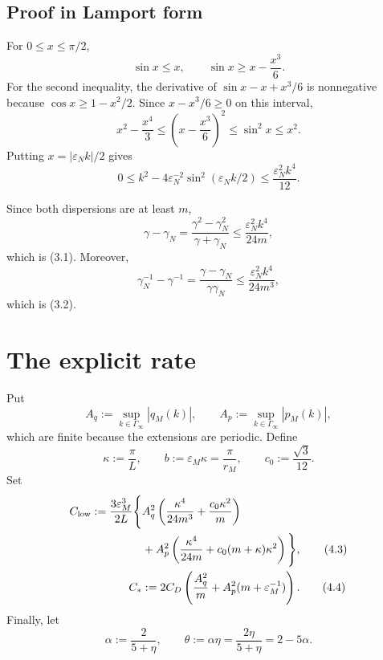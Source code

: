 \documentclass[11pt,a4paper]{article}
\newcommand{\eps}{\varepsilon}
\begin{document}
\subsection*{Proof in Lamport form}


For \(0\le x\le\pi/2\),
\[
 \sin x\le x,\qquad \sin x\ge x-\frac{x^3}{6}.                 \tag{3.3}
\]
For the second inequality, the derivative of
\(\sin x-x+x^3/6\) is nonnegative because
\(\cos x\ge1-x^2/2\).  Since \(x-x^3/6\ge0\) on this interval,
\[
 x^2-\frac{x^4}{3}
 \le\left(x-\frac{x^3}{6}\right)^2
 \le\sin^2x\le x^2.                                           \tag{3.4}
\]
Putting \(x=|\eps_Nk|/2\) gives
\[
 0\le k^2-4\eps_N^{-2}\sin^2(\eps_Nk/2)
 \le\frac{\eps_N^2k^4}{12}.                                   \tag{3.5}
\]


Since both dispersions are at least \(m\),
\[
 \gamma-\gamma_N
 =\frac{\gamma^2-\gamma_N^2}{\gamma+\gamma_N}
 \le\frac{\eps_N^2k^4}{24m},                                  \tag{3.6}
\]
which is (3.1).  Moreover,
\[
 \gamma_N^{-1}-\gamma^{-1}
 =\frac{\gamma-\gamma_N}{\gamma\gamma_N}
 \le\frac{\eps_N^2k^4}{24m^3},                                \tag{3.7}
\]
which is (3.2). \QedStep

\section{The explicit rate}\label{sec:rate}

Put
\[
 A_q:=\sup_{k\in\Gamma_\infty}|\widehat q_M(k)|,\qquad
 A_p:=\sup_{k\in\Gamma_\infty}|\widehat p_M(k)|,                \tag{4.1}
\]
which are finite because the extensions are periodic.  Define
\[
 \kappa:=\frac{\pi}{L},\qquad b:=\eps_M\kappa=\frac{\pi}{r_M},
 \qquad c_0:=\frac{\sqrt3}{12}.                                \tag{4.2}
\]
Set
\begin{align}
 C_{\rm low}
 :=\frac{3\eps_M^3}{2L}\Bigg\{&
 A_q^2\left(\frac{\kappa^4}{24m^3}+\frac{c_0\kappa^2}{m}\right)\\
 &+A_p^2\left(\frac{\kappa^4}{24m}
       +c_0(m+\kappa)\kappa^2\right)\Bigg\},                   \tag{4.3}\\
 C_*&:=2C_D\left(\frac{A_q^2}{m}
              +A_p^2(m+\eps_M^{-1})\right).                   \tag{4.4}
\end{align}
Finally, let
\[
 \alpha:=\frac{2}{5+\eta},\qquad
 \theta:=\alpha\eta=\frac{2\eta}{5+\eta}=2-5\alpha.             \tag{4.5}
\]
\end{document}
